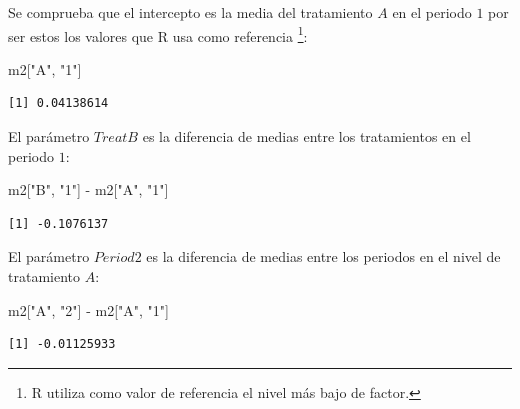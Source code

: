 \documentclass[
  12pt,
  a4paper,
  extrafontsizes,
  onecolumn,
  openright,
  table]{memoir}
\newenvironment{Shaded}{\begin{snugshade}}{\end{snugshade}}
\newcommand{\NormalTok}[1]{\textcolor[rgb]{0.00,0.23,0.31}{#1}}
\newcommand{\SpecialCharTok}[1]{\textcolor[rgb]{0.37,0.37,0.37}{#1}}
\newcommand{\StringTok}[1]{\textcolor[rgb]{0.13,0.47,0.30}{#1}}
\begin{document}
\normalsize

Se comprueba que el intercepto es la media del tratamiento \(A\) en el
periodo \(1\) por ser estos los valores que R usa como referencia
\footnote{R utiliza como valor de referencia el nivel más bajo de
  factor.}:

\scriptsize

\begin{Shaded}
\begin{Highlighting}[]
\NormalTok{m2[}\StringTok{"A"}\NormalTok{, }\StringTok{"1"}\NormalTok{]}
\end{Highlighting}
\end{Shaded}

\begin{verbatim}
[1] 0.04138614
\end{verbatim}

\normalsize

El parámetro \(TreatB\) es la diferencia de medias entre los
tratamientos en el periodo \(1\):

\scriptsize

\begin{Shaded}
\begin{Highlighting}[]
\NormalTok{m2[}\StringTok{"B"}\NormalTok{, }\StringTok{"1"}\NormalTok{] }\SpecialCharTok{{-}}\NormalTok{ m2[}\StringTok{"A"}\NormalTok{, }\StringTok{"1"}\NormalTok{]}
\end{Highlighting}
\end{Shaded}

\begin{verbatim}
[1] -0.1076137
\end{verbatim}

\normalsize

El parámetro \(Period2\) es la diferencia de medias entre los periodos
en el nivel de tratamiento \(A\):

\scriptsize

\begin{Shaded}
\begin{Highlighting}[]
\NormalTok{m2[}\StringTok{"A"}\NormalTok{, }\StringTok{"2"}\NormalTok{] }\SpecialCharTok{{-}}\NormalTok{ m2[}\StringTok{"A"}\NormalTok{, }\StringTok{"1"}\NormalTok{]}
\end{Highlighting}
\end{Shaded}

\begin{verbatim}
[1] -0.01125933
\end{verbatim}

\normalsize
\end{document}
